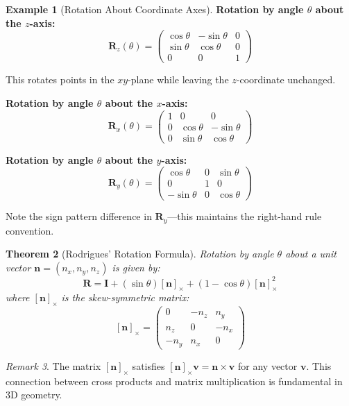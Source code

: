 \documentclass[12pt]{article}
\numberwithin{equation}{section}
\newcommand{\vect}[1]{\boldsymbol{#1}}   %
\newcommand{\mat}[1]{\mathbf{#1}}        %
\theoremstyle{plain}
\newtheorem{theorem}{Theorem}[section]
\theoremstyle{definition}
\newtheorem{example}[theorem]{Example}
\theoremstyle{remark}
\newtheorem{remark}[theorem]{Remark}
\begin{document}
\begin{example}[Rotation About Coordinate Axes]
\textbf{Rotation by angle $\theta$ about the $z$-axis:}
$$\mat{R}_z(\theta) = \begin{pmatrix} \cos\theta & -\sin\theta & 0 \\ \sin\theta & \cos\theta & 0 \\ 0 & 0 & 1 \end{pmatrix}$$

This rotates points in the $xy$-plane while leaving the $z$-coordinate unchanged.

\textbf{Rotation by angle $\theta$ about the $x$-axis:}
$$\mat{R}_x(\theta) = \begin{pmatrix} 1 & 0 & 0 \\ 0 & \cos\theta & -\sin\theta \\ 0 & \sin\theta & \cos\theta \end{pmatrix}$$

\textbf{Rotation by angle $\theta$ about the $y$-axis:}
$$\mat{R}_y(\theta) = \begin{pmatrix} \cos\theta & 0 & \sin\theta \\ 0 & 1 & 0 \\ -\sin\theta & 0 & \cos\theta \end{pmatrix}$$

Note the sign pattern difference in $\mat{R}_y$—this maintains the right-hand rule convention.
\end{example}

\begin{theorem}[Rodrigues' Rotation Formula]
Rotation by angle $\theta$ about a unit vector $\vect{n} = (n_x, n_y, n_z)$ is given by:
$$\mat{R} = \mat{I} + (\sin\theta)[\vect{n}]_{\times} + (1-\cos\theta)[\vect{n}]_{\times}^2$$
where $[\vect{n}]_{\times}$ is the skew-symmetric matrix:
$$[\vect{n}]_{\times} = \begin{pmatrix} 0 & -n_z & n_y \\ n_z & 0 & -n_x \\ -n_y & n_x & 0 \end{pmatrix}$$
\end{theorem}

\begin{remark}
The matrix $[\vect{n}]_{\times}$ satisfies $[\vect{n}]_{\times}\vect{v} = \vect{n} \times \vect{v}$ for any vector $\vect{v}$. This connection between cross products and matrix multiplication is fundamental in 3D geometry.
\end{remark}
\end{document}
